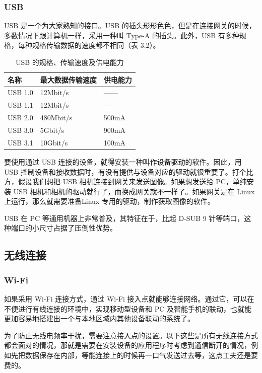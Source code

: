 \documentclass[12pt,UTF8]{ctexbook}
\begin{document}
\subsubsection{USB}

USB 是一个为大家熟知的接口。USB 的插头形形色色，但是在连接网关的时候，多数情况下跟计算机一样，采用一种叫 Type-A 的插头。此外，USB 有多种规格，每种规格传输数据的速度都不相同（表 3.2）。

\begin{table}[!ht] 
	\centering
	\caption{USB 的规格、传输速度及供电能力}
	\begin{tabular}{|l|l|l|}
		\hline
		名称 & 最大数据传输速度 & 供电能力 \\
		\hline
		USB 1.0 & 12Mbit/s & —— \\
		\hline
		USB 1.1 & 12Mbit/s & —— \\
		\hline
		USB 2.0 & 480Mbit/s & 500mA \\
		\hline
		USB 3.0 & 5Gbit/s & 900mA \\
		\hline
		USB 3.1 & 10Gbit/s & 100mA \\
		\hline
	\end{tabular}
\end{table}

要使用通过 USB 连接的设备，就得安装一种叫作设备驱动的软件。因此，用 USB 控制设备和接收数据时，有没有提供与设备对应的驱动就很重要了。打个比方，假设我们想把 USB 相机连接到网关来发送图像。如果想发送给 PC，单纯安装 USB 相机和相机的驱动就行了，而换成网关就不一样了。如果网关是在 Linux 上运行，那么就需要准备Linux 专用的驱动，制作获取图像的软件。

USB 在 PC 等通用机器上非常普及，其特征在于，比起 D-SUB 9 针等端口，这种端口的小尺寸占据了压倒性优势。

\subsection{无线连接}

\subsubsection{Wi-Fi}

如果采用 Wi-Fi 连接方式，通过 Wi-Fi 接入点就能够连接网络。通过它，可以在不便进行有线连接的环境中，实现移动型设备和 PC 及智能手机的联动，也就能更加容易地搭建出一个与本地区域内其他设备联动的系统了。

为了防止无线电频率干扰，需要注意接入点的设置。以下这些是所有无线连接方式都会面对的情况，那就是需要在安装设备的应用程序时考虑到通信断开的情况，例如先把数据保存在内部，等能连接上的时候再一口气发送过去等，这点工夫还是要费的。
\end{document}
